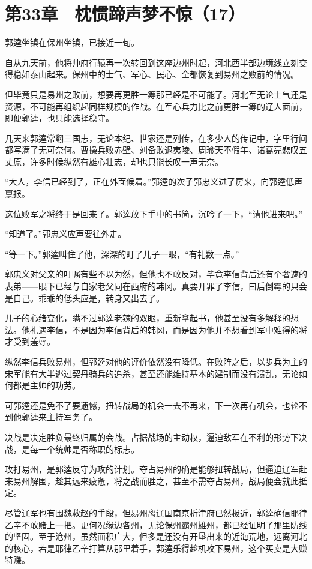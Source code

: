 \section{第33章　枕惯蹄声梦不惊（17）}

郭逵坐镇在保州坐镇，已接近一旬。

自从九天前，他将帅府行辕再一次转回到这座边州时起，河北西半部边境线立刻变得稳如泰山起来。保州中的士气、军心、民心、全都恢复到易州之败前的情况。

但毕竟只是易州之败前，想要再更胜一筹那已经是不可能了。河北军无论士气还是资源，不可能再组织起同样规模的作战。在军心兵力比之前更胜一筹的辽人面前，即便郭逵，也只能选择稳守。

几天来郭逵常翻三国志，无论本纪、世家还是列传，在多少人的传记中，字里行间都写满了无可奈何。曹操兵败赤壁、刘备败退夷陵、周瑜天不假年、诸葛亮悲叹五丈原，许多时候纵然有雄心壮志，却也只能长叹一声无奈。

“大人，李信已经到了，正在外面候着。”郭逵的次子郭忠义进了房来，向郭逵低声禀报。

这位败军之将终于是回来了。郭逵放下手中的书简，沉吟了一下，“请他进来吧。”

“知道了。”郭忠义应声要往外走。

“等一下。”郭逵叫住了他，深深的盯了儿子一眼，“有礼数一点。”

郭忠义对父亲的叮嘱有些不以为然，但他也不敢反对，毕竟李信背后还有个奢遮的表弟——眼下已经与自家老父同在西府的韩冈。真要开罪了李信，曰后倒霉的只会是自己。乖乖的低头应是，转身又出去了。

儿子的心绪变化，瞒不过郭逵老辣的双眼，重新拿起书，他甚至没有多解释的想法。他礼遇李信，不是因为李信背后的韩冈，而是因为他并不想看到军中难得的将才受到羞辱。

纵然李信兵败易州，但郭逵对他的评价依然没有降低。在败阵之后，以步兵为主的宋军能有大半逃过契丹骑兵的追杀，甚至还能维持基本的建制而没有溃乱，无论如何都是主帅的功劳。

可郭逵还是免不了要遗憾，扭转战局的机会一去不再来，下一次再有机会，也轮不到他郭逵来主持军务了。

决战是决定胜负最终归属的会战。占据战场的主动权，逼迫敌军在不利的形势下决战，是每一个统帅是否称职的标志。

攻打易州，是郭逵反守为攻的计划。夺占易州的确是能够扭转战局，但逼迫辽军赶来易州解围，趁其远来疲惫，将之战而胜之，甚至不需夺占易州，战局便会就此抵定。

尽管辽军也有围魏救赵的手段，但易州离辽国南京析津府已然极近，郭逵确信耶律乙辛不敢赌上一把。更何况缘边各州，无论保州霸州雄州，都已经证明了那里防线的坚固。至于沧州，虽然面积广大，但多是还没有开垦出来的近海荒地，远离河北的核心，若是耶律乙辛打算从那里着手，郭逵乐得趁机攻下易州，这个买卖是大赚特赚。

